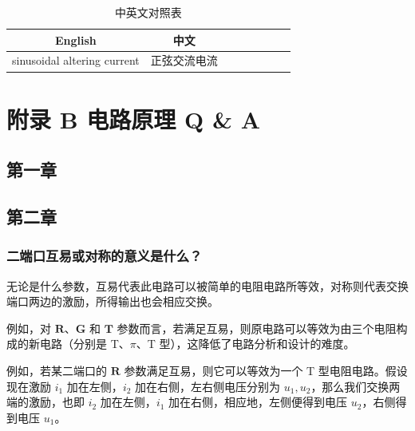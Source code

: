 \documentclass[UTF8]{report}
\theoremstyle{MyLineTheoremStyle} %
\theoremstyle{MyBlockTheoremStyle} %
\theoremstyle{MySubsubsectionStyle} %
\begin{document}
\begin{multicols}{2}
\begin{table}[H]\centering
    \caption{中英文对照表}
    \begin{tabular}{cccccccc}\toprule
        English & 中文 \\
        \midrule
        sinusoidal altering current & 正弦交流电流 \\
        \bottomrule
    \end{tabular}
\end{table}

\end{multicols} 

\chapter*{附录 B\hspace*{20pt} 电路原理 Q \& A}\setcounter{chapter}{2} 
\setcounter{equation}{0}    %
\thispagestyle{fancy} 
\setcounter{section}{0}   
\setcounter{chapter}{1} 
\renewcommand\thesection{B.\arabic{section}}   
\renewcommand{\thefigure}{B.\arabic{figure}} 
\renewcommand{\thetable}{B.\arabic{table}}

\section{第一章}

\section{第二章}

\subsection{二端口互易或对称的意义是什么？}

无论是什么参数，互易代表此电路可以被简单的电阻电路所等效，对称则代表交换端口两边的激励，所得输出也会相应交换。

例如，对 $\boldsymbol{R}$、$\boldsymbol{G}$ 和 $\boldsymbol{T}$ 参数而言，若满足互易，则原电路可以等效为由三个电阻构成的新电路（分别是 T、$\pi$、T 型），这降低了电路分析和设计的难度。

例如，若某二端口的 $\boldsymbol{R}$ 参数满足互易，则它可以等效为一个 T 型电阻电路。假设现在激励 $i_1$ 加在左侧，$i_2$ 加在右侧，左右侧电压分别为 $u_1, u_2$，那么我们交换两端的激励，也即 $i_2$ 加在左侧，$i_1$ 加在右侧，相应地，左侧便得到电压 $u_2$，右侧得到电压 $u_1$。
\end{document}
